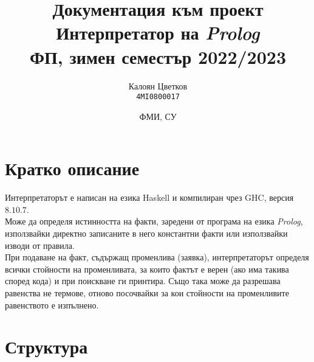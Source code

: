 \documentclass[15pt]{extarticle}
\title{\Huge Документация към проект\\ \huge Интерпретатор на \emph{Prolog}\\ \large ФП, зимен семестър 2022/2023}
\author{Калоян Цветков\\ \texttt{4MI0800017}}
\date{ФМИ, СУ\\ \version}
\begin{document}
	
	\begin{titlingpage}
		\maketitle
	\end{titlingpage}
	\tableofcontents
	\newpage
	\large
	
	\section{Кратко описание}
	
	Интерпретаторът е написан на езика Haskell и компилиран чрез GHC, версия $8.10.7$.\\
	Може да определя истинността на факти, заредени от програма на езика \emph{Prolog}, използвайки директно записаните в него константни факти или използвайки изводи от правила.\\
	При подаване на факт, съдържащ променлива (заявка), интерпретаторът определя всички стойности на променливата, за които фактът е верен (ако има такива според кода) и при поискване ги принтира. Също така може да разрешава равенства не термове, отново посочвайки за кои стойности на променливите равенството е изпълнено.
	
	\section{Структура}
	
\end{document}
